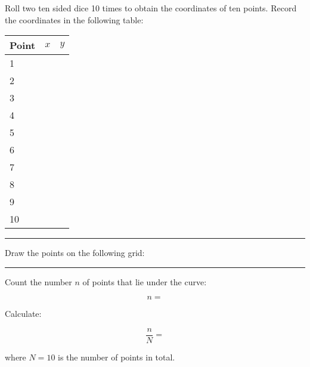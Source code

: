 \documentclass{article}
\begin{document}
Roll two ten sided dice 10 times to obtain the coordinates of ten points.
Record the coordinates in the following table:

    \begin{center}
        \begin{tabular}{lcc}
            \toprule
            Point&$x$&$y$\\
            \midrule
            1&&\\
            2&&\\
            3&&\\
            4&&\\
            5&&\\
            6&&\\
            7&&\\
            8&&\\
            9&&\\
            10&&\\
            \bottomrule
        \end{tabular}
    \end{center}

\rule{\textwidth}{.2pt}

Draw the points on the following grid:\\

    \begin{center}
    \end{center}

\rule{\textwidth}{.2pt}

Count the number $n$ of points that lie under the {\color{red}{red}} curve:

    $$n = $$

Calculate:

    $$\frac{n}{N}=$$

where $N=10$ is the number of points in total.
\end{document}
